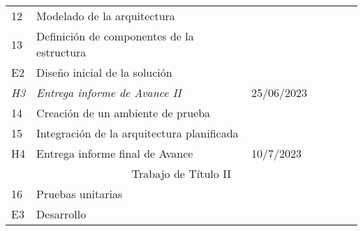 \begin{longtable}[c]{@{}llllllll@{}}
	12                                     & Modelado de la arquitectura                     &                                       &                                          &               &                &                  &                 \\
	13                                     & Definición de componentes de la estructura      &                                       &                                          &               &                &                  &                 \\
	E2                                     & Diseño inicial de la solución                   &                                       &                                          &               &                &                  &                 \\
	\textit{H3}                            & \textit{Entrega informe de Avance II}           & \multicolumn{2}{l}{25/06/2023}        &                                          &               &                &                                    \\
	14                                     & Creación de un ambiente de prueba               &                                       &                                          &               &                &                  &                 \\
	15                                     & Integración de la arquitectura planificada      &                                       &                                          &               &                &                  &                 \\
	H4                                     & Entrega informe final de Avance                 & \multicolumn{2}{l}{10/7/2023}         &                                          &               &                &                                    \\* \midrule
	\multicolumn{8}{c}{Trabajo de Título II}                                                                                                                                                                                                          \\* \midrule
	16                                     & Pruebas unitarias                               &                                       &                                          &               &                &                  &                 \\
	E3                                     & Desarrollo                                      &                                       &                                          &               &                &                  &                 \\

\end{longtable}
